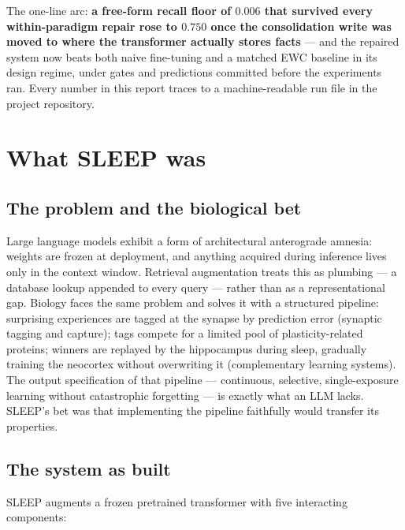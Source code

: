 \documentclass[11pt]{article}
\begin{document}
The one-line arc: \textbf{a free-form recall floor of $0.006$ that survived every within-paradigm
repair rose to $0.750$ once the consolidation write was moved to where the transformer actually
stores facts} --- and the repaired system now beats both naive fine-tuning and a matched EWC
baseline in its design regime, under gates and predictions committed before the experiments ran.
Every number in this report traces to a machine-readable run file in the project repository.

\section{What SLEEP was}

\subsection{The problem and the biological bet}

Large language models exhibit a form of architectural anterograde amnesia: weights are frozen at
deployment, and anything acquired during inference lives only in the context window. Retrieval
augmentation treats this as plumbing --- a database lookup appended to every query --- rather than
as a representational gap. Biology faces the same problem and solves it with a structured
pipeline: surprising experiences are tagged at the synapse by prediction error (synaptic tagging
and capture); tags compete for a limited pool of plasticity-related proteins; winners are replayed
by the hippocampus during sleep, gradually training the neocortex without overwriting it
(complementary learning systems). The output specification of that pipeline --- continuous,
selective, single-exposure learning without catastrophic forgetting --- is exactly what an LLM
lacks. SLEEP's bet was that implementing the pipeline faithfully would transfer its properties.

\subsection{The system as built}

SLEEP augments a frozen pretrained transformer with five interacting components:
\end{document}
